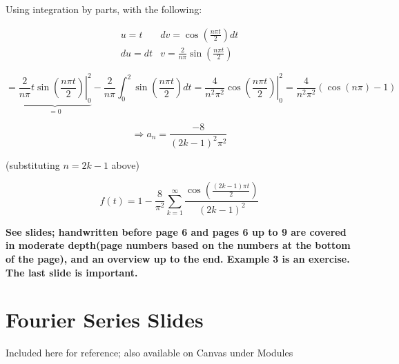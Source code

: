 \documentclass{article}
\begin{document}
Using integration by parts, with the following:

$$\begin{matrix} u = t & dv = \cos(\frac{n \pi t}{2}) dt \\ du = dt & v = \frac{2}{n \pi} \sin(\frac{n \pi t}{2}) \end{matrix}$$

$$ = \underbrace{\left. \frac{2}{n \pi} t \sin(\frac{n \pi t}{2} ) \right|_0^2}_{ = 0} - \frac{2}{n \pi} \int_{0}^2 \sin(\frac{n \pi t}{2}) dt = \left. \frac{4}{n^2 \pi^2} \cos(\frac{n \pi t}{2}) \right|_0^2 = \frac{4}{n^2 \pi^2} (\cos(n \pi) - 1)$$

$$\Rightarrow a_n = \frac{-8}{(2k-1)^2 \pi^2}$$

(substituting $n = 2k-1$ above)

$$f(t) = 1 - \frac{8}{\pi^2} \sum_{k = 1}^\infty \frac{\cos \left( \frac{(2k-1) \pi t}{2} \right)}{(2k-1)^2}$$

\textbf{See slides; handwritten before page 6 and pages 6 up to 9 are covered in moderate depth(page numbers based on the numbers at the bottom of the page), and an overview up to the end. Example 3 is an exercise. The last slide is important.}

\section{Fourier Series Slides}

Included here for reference; also available on Canvas under Modules


\end{document}
